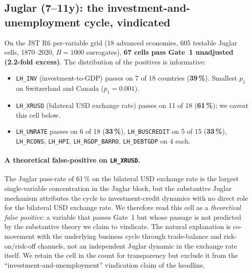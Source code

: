 \subsection{Juglar (7--11y): the investment-and-unemployment cycle, vindicated}
\label{sec:juglar_results}

On the JST R6 per-variable grid (18 advanced economies,
605 testable Juglar cells, 1870--2020, \(B=1000\) surrogates),
\textbf{67 cells pass Gate~1 unadjusted (2.2-fold excess)}. The
distribution of the positives is informative:

\begin{itemize}
\item \texttt{LH\_INV} (investment-to-GDP) passes on 7 of 18
  countries (\textbf{39\,\%}). Smallest \(p_1\) on Switzerland
  and Canada (\(p_1=0.001\)).
\item \texttt{LH\_XRUSD} (bilateral USD exchange rate) passes on
  11 of 18 (\textbf{61\,\%}); we caveat this cell below.
\item \texttt{LH\_UNRATE} passes on 6 of 18 (\textbf{33\,\%}),
  \texttt{LH\_BUSCREDIT} on 5 of 15 (\textbf{33\,\%}),
  \texttt{LH\_RCONS}, \texttt{LH\_HPI},
  \texttt{LH\_RGDP\_BARRO}, \texttt{LH\_DEBTGDP} on 4 each.
\end{itemize}

\paragraph{A theoretical false-positive on \texttt{LH\_XRUSD}.}
The Juglar pass-rate of 61\,\% on the bilateral USD exchange rate
is the largest single-variable concentration in the Juglar block,
but the substantive Juglar mechanism
\citep{juglar1862,schumpeter1939} attributes the cycle to
investment-credit dynamics with no direct role for the bilateral
USD exchange rate. We therefore read this cell as a
\emph{theoretical false positive}: a variable that passes Gate~1
but whose passage is not predicted by the substantive theory we
claim to vindicate. The natural explanation is co-movement with
the underlying business cycle through trade-balance and
risk-on/risk-off channels, not an independent Juglar dynamic in
the exchange rate itself. We retain the cell in the count for
transparency but exclude it from the
``investment-and-unemployment'' vindication claim of the
headline.

